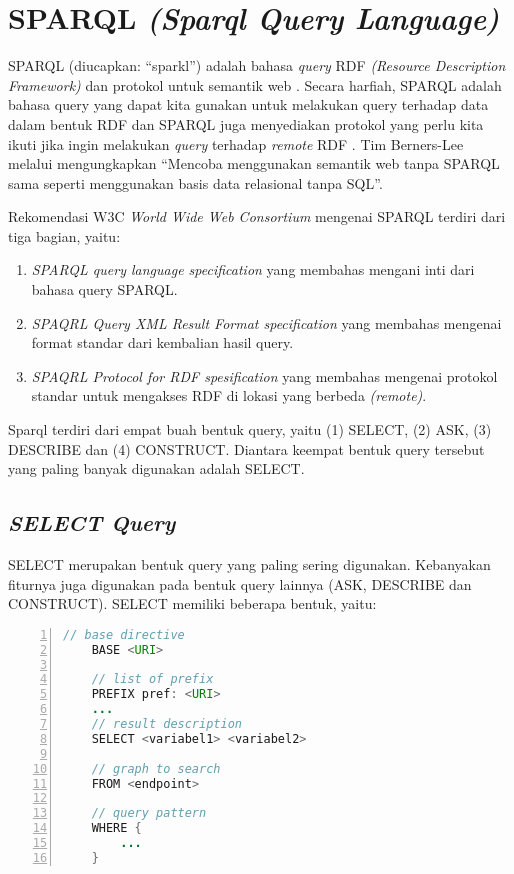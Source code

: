 \section{SPARQL \emph{(Sparql Query Language)}}
SPARQL (diucapkan: ``sparkl'') adalah bahasa \emph{query} RDF \emph{(Resource Description Framework)} dan protokol untuk semantik web \citep{liyang_yu}. Secara harfiah, SPARQL adalah bahasa query yang dapat kita gunakan untuk melakukan query terhadap data dalam bentuk RDF dan SPARQL juga menyediakan protokol yang perlu kita ikuti jika ingin melakukan \emph{query} terhadap \emph{remote} RDF \citep{liyang_yu}. Tim Berners-Lee melalui \citet{ducharme} mengungkapkan ``Mencoba menggunakan semantik web tanpa SPARQL sama seperti menggunakan basis data relasional tanpa SQL''.

Rekomendasi W3C \emph{World Wide Web Consortium} mengenai SPARQL terdiri dari tiga bagian, yaitu:

\begin{enumerate}
	\item \emph{SPARQL query language specification} yang membahas mengani inti dari bahasa query SPARQL.
	\item \emph{SPAQRL Query XML Result Format specification} yang membahas mengenai format standar dari kembalian hasil query.
	\item \emph{SPAQRL Protocol for RDF spesification} yang membahas mengenai protokol standar untuk mengakses RDF di lokasi yang berbeda \emph{(remote)}.
\end{enumerate}

Sparql terdiri dari empat buah bentuk query, yaitu (1) SELECT, (2) ASK, (3) DESCRIBE dan (4) CONSTRUCT. Diantara keempat bentuk query tersebut yang paling banyak digunakan adalah SELECT.

\subsection{\emph{SELECT Query}}
SELECT merupakan bentuk query yang paling sering digunakan. Kebanyakan fiturnya juga digunakan pada bentuk query lainnya (ASK, DESCRIBE dan CONSTRUCT). SELECT memiliki beberapa bentuk, yaitu:

\begin{lstlisting}[language=JAVA, xleftmargin=15pt, numbers=left]
 	// base directive
 	BASE <URI>

 	// list of prefix 
 	PREFIX pref: <URI>
 	...
 	// result description
 	SELECT <variabel1> <variabel2>

 	// graph to search
 	FROM <endpoint>

 	// query pattern
 	WHERE {
 		...
 	}
\end{lstlisting} 

